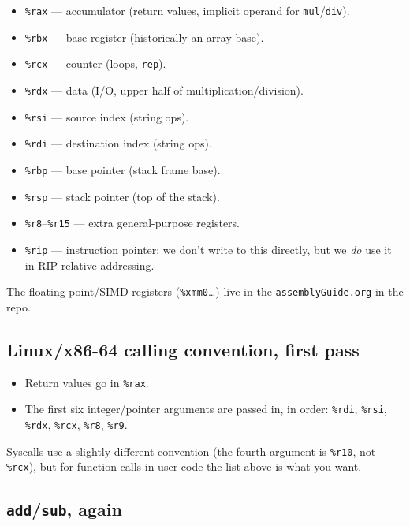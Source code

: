 \documentclass[11pt]{article}
\begin{document}
\begin{itemize}
  \item \texttt{\%rax} --- accumulator (return values, implicit operand
    for \texttt{mul}/\texttt{div}).
  \item \texttt{\%rbx} --- base register (historically an array base).
  \item \texttt{\%rcx} --- counter (loops, \texttt{rep}).
  \item \texttt{\%rdx} --- data (I/O, upper half of
    multiplication/division).
  \item \texttt{\%rsi} --- source index (string ops).
  \item \texttt{\%rdi} --- destination index (string ops).
  \item \texttt{\%rbp} --- base pointer (stack frame base).
  \item \texttt{\%rsp} --- stack pointer (top of the stack).
  \item \texttt{\%r8}--\texttt{\%r15} --- extra general-purpose
    registers.
  \item \texttt{\%rip} --- instruction pointer; we don't write to this
    directly, but we \emph{do} use it in RIP-relative addressing.
\end{itemize}

The floating-point/SIMD registers (\texttt{\%xmm0}\ldots{}) live in
the \texttt{assemblyGuide.org} in the repo.

\subsection*{Linux/x86-64 calling convention, first pass}

\begin{itemize}
  \item Return values go in \texttt{\%rax}.
  \item The first six integer/pointer arguments are passed in, in
    order:
    \texttt{\%rdi}, \texttt{\%rsi}, \texttt{\%rdx}, \texttt{\%rcx},
    \texttt{\%r8}, \texttt{\%r9}.
\end{itemize}

Syscalls use a slightly different convention (the fourth argument is
\texttt{\%r10}, not \texttt{\%rcx}), but for function calls in user
code the list above is what you want.

\subsection*{\texttt{add}/\texttt{sub}, again}
\end{document}
